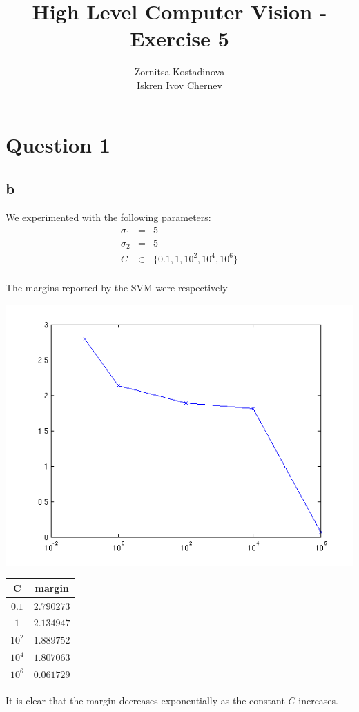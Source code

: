 \documentclass[a4paper]{article}
\begin{document}
\title{High Level Computer Vision - Exercise 5}
\author{Zornitsa Kostadinova \\ Iskren Ivov Chernev}
\maketitle

\section*{Question 1}
\subsection*{b}
We experimented with the following parameters:
\begin{eqnarray*}
\sigma_1 &=& 5 \\
\sigma_2 &=& 5 \\
C &\in& \{ 0.1, 1, 10^2, 10^4, 10^6 \} \\
\end{eqnarray*}

The margins reported by the SVM were respectively

\includegraphics[scale=0.5]{margin_vs_c.png}

\begin{tabular}{|c|c|}
\hline
C   & margin \\ \hline \hline
$ 0.1 $ & $ 2.790273 $ \\
$ 1 $ & $ 2.134947 $ \\
$ 10^2 $ & $ 1.889752 $ \\
$ 10^4 $ & $ 1.807063 $ \\
$ 10^6 $ & $ 0.061729 $ \\ \hline
\end{tabular}

It is clear that the margin decreases exponentially as the constant $ C $ increases.
\end{document}
